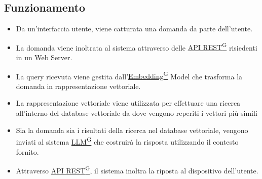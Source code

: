 \documentclass{article}
\begin{document}
    \subsection{Funzionamento}
    \begin{itemize}
        \item Da un’interfaccia utente, viene catturata una domanda da parte dell’utente.
        \item La domanda viene inoltrata al sistema attraverso delle \href{https://code7crusaders.github.io/docs/PB/documentazione_interna/glossario.html#api-rest-representational-state-transfer}{API REST\textsuperscript{G}} risiedenti in un Web Server.
        \item La query ricevuta viene gestita dall’\href{https://code7crusaders.github.io/docs/PB/documentazione_interna/glossario.html#embedding}{Embedding\textsuperscript{G}} Model che trasforma la domanda in rappresentazione vettoriale.
        \item La rappresentazione vettoriale viene utilizzata per effettuare una ricerca all’interno del database vettoriale da dove vengono reperiti i vettori più simili
        \item Sia la domanda sia i risultati della ricerca nel database vettoriale, vengono inviati al sistema \href{https://code7crusaders.github.io/docs/PB/documentazione_interna/glossario.html#llm-large-language-model}{LLM\textsuperscript{G}} che costruirà la risposta utilizzando il contesto fornito.
        \item Attraverso \href{https://code7crusaders.github.io/docs/PB/documentazione_interna/glossario.html#api-rest-representational-state-transfer}{API REST\textsuperscript{G}}, il sistema inoltra la riposta al dispositivo dell’utente.
    \end{itemize}
\end{document}
